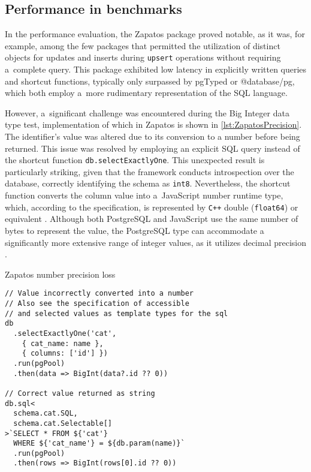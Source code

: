 \subsection*{Performance in benchmarks}

In the performance evaluation, the Zapatos package proved notable, as it was,
for example, among the few packages that permitted the utilization of distinct
objects for updates and inserts during \texttt{upsert} operations without
requiring a~complete query. This package exhibited low latency in explicitly
written queries and shortcut functions, typically only surpassed by
pgTyped or @database/pg, which both employ a~more rudimentary
representation of the SQL language.

However, a~significant challenge was encountered during the Big Integer data
type test, implementation of which in Zapatos is shown in
\autoref{lst:ZapatosPrecision}. The identifier's value was altered due to its
conversion to a number before being returned. This issue was resolved by
employing an explicit SQL query instead of the shortcut function
\texttt{db.selectExactlyOne}. This unexpected result is particularly striking,
given that the framework conducts introspection over the database, correctly
identifying the schema as \texttt{int8}. Nevertheless, the shortcut function
converts the column value into a~JavaScript number runtime type, which,
according to the specification, is represented by \texttt{C++} double
(\texttt{float64}) or equivalent \cite{MDNNumber}. Although both PostgreSQL and
JavaScript use the same number of bytes to represent the value, the PostgreSQL
type can accommodate a significantly more extensive range of integer values, as
it utilizes decimal precision \cite{PostgresNumeric}.

\begin{listing}
\caption{Zapatos number precision loss}
\label{lst:ZapatosPrecision}
\begin{verbatim}
// Value incorrectly converted into a number
// Also see the specification of accessible 
// and selected values as template types for the sql
db
  .selectExactlyOne('cat', 
    { cat_name: name }, 
    { columns: ['id'] })
  .run(pgPool)
  .then(data => BigInt(data?.id ?? 0))

// Correct value returned as string
db.sql<
  schema.cat.SQL,
  schema.cat.Selectable[]
>`SELECT * FROM ${'cat'} 
  WHERE ${'cat_name'} = ${db.param(name)}`
  .run(pgPool)
  .then(rows => BigInt(rows[0].id ?? 0))
\end{verbatim}
\end{listing}

